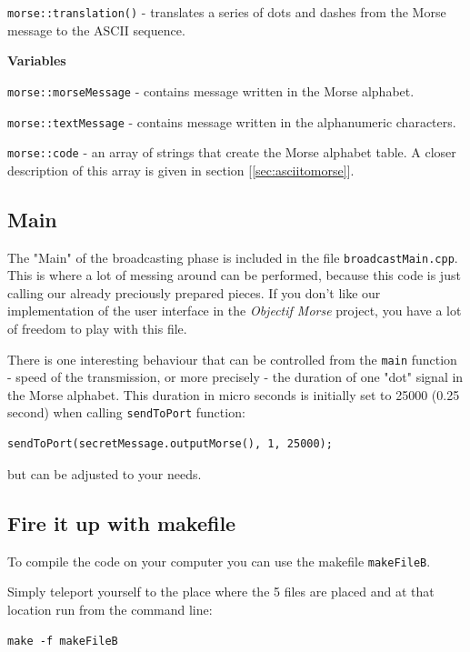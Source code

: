 \documentclass[12pt]{report}
\begin{document}
\verb|morse::translation()| - translates a series of dots and dashes from the Morse message to the ASCII sequence.

\textbf{Variables}

\verb|morse::morseMessage| - contains message written in the Morse alphabet.

\verb|morse::textMessage| - contains message written in the alphanumeric characters.

\verb|morse::code| - an array of strings that create the Morse alphabet table. A closer description of this array is given in section [\ref{sec:asciitomorse}].


\subsection{Main}

The "Main" of the broadcasting phase is included in the file \verb|broadcastMain.cpp|. This is where a lot of messing around can be performed, because this code is just calling our already preciously prepared pieces. If you don't like our implementation of the user interface in the \textit{Objectif Morse} project, you have a lot of freedom to play with this file.

There is one interesting behaviour that can be controlled from the \verb|main| function - speed of the transmission, or more precisely - the duration of one "dot" signal in the Morse alphabet. This duration in micro seconds is initially set to 25000 (0.25 second) when calling \verb|sendToPort| function: 

\begin{lstlisting}
sendToPort(secretMessage.outputMorse(), 1, 25000);
\end{lstlisting}

but can be adjusted to your needs.

\subsection{Fire it up with makefile}

To compile the code on your computer you can use the makefile \verb|makeFileB|.

Simply teleport yourself to the place where the 5 files are placed and at that location run from the command line:

\begin{snugshade}
\verb|make -f makeFileB|
\end{snugshade}
\end{document}
